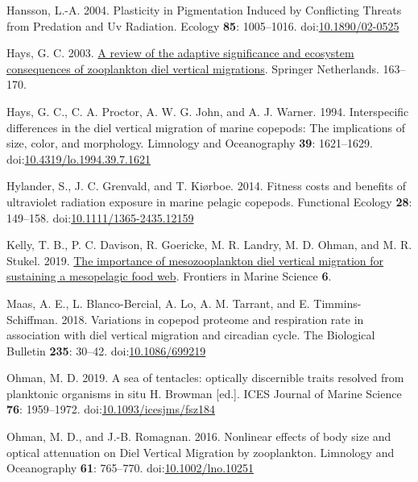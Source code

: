 \documentclass[
]{article}
\newlength{\cslhangindent}
\newlength{\cslentryspacingunit} %
\newenvironment{CSLReferences}[2] %
 {%
  \setlength{\parindent}{0pt}
  \ifodd #1
  \let\oldpar\par
  \def\par{\hangindent=\cslhangindent\oldpar}
  \fi
  \setlength{\parskip}{#2\cslentryspacingunit}
 }%
 {}
\begin{document}
\begin{CSLReferences}{1}{0}
\leavevmode{}%
Hansson, L.-A. 2004. Plasticity in Pigmentation Induced by Conflicting
Threats from Predation and Uv Radiation. Ecology \textbf{85}:
1005--1016. doi:\href{https://doi.org/10.1890/02-0525}{10.1890/02-0525}

\leavevmode{}%
Hays, G. C. 2003. \href{https://doi.org/10.1007/978-94-017-2276-6_18}{A
review of the adaptive significance and ecosystem consequences of
zooplankton diel vertical migrations}. Springer Netherlands. 163--170.

\leavevmode{}%
Hays, G. C., C. A. Proctor, A. W. G. John, and A. J. Warner. 1994.
Interspecific differences in the diel vertical migration of marine
copepods: The implications of size, color, and morphology. Limnology and
Oceanography \textbf{39}: 1621--1629.
doi:\href{https://doi.org/10.4319/lo.1994.39.7.1621}{10.4319/lo.1994.39.7.1621}

\leavevmode{}%
Hylander, S., J. C. Grenvald, and T. Kiørboe. 2014. Fitness costs and
benefits of ultraviolet radiation exposure in marine pelagic copepods.
Functional Ecology \textbf{28}: 149--158.
doi:\href{https://doi.org/10.1111/1365-2435.12159}{10.1111/1365-2435.12159}

\leavevmode{}%
Kelly, T. B., P. C. Davison, R. Goericke, M. R. Landry, M. D. Ohman, and
M. R. Stukel. 2019.
\href{https://www.frontiersin.org/articles/10.3389/fmars.2019.00508}{The
importance of mesozooplankton diel vertical migration for sustaining a
mesopelagic food web}. Frontiers in Marine Science \textbf{6}.

\leavevmode{}%
Maas, A. E., L. Blanco-Bercial, A. Lo, A. M. Tarrant, and E.
Timmins-Schiffman. 2018. Variations in copepod proteome and respiration
rate in association with diel vertical migration and circadian cycle.
The Biological Bulletin \textbf{235}: 30--42.
doi:\href{https://doi.org/10.1086/699219}{10.1086/699219}

\leavevmode{}%
Ohman, M. D. 2019. A sea of tentacles: optically discernible traits
resolved from planktonic organisms in situ H. Browman {[}ed.{]}. ICES
Journal of Marine Science \textbf{76}: 1959--1972.
doi:\href{https://doi.org/10.1093/icesjms/fsz184}{10.1093/icesjms/fsz184}

\leavevmode{}%
Ohman, M. D., and J.-B. Romagnan. 2016. Nonlinear effects of body size
and optical attenuation on Diel Vertical Migration by zooplankton.
Limnology and Oceanography \textbf{61}: 765--770.
doi:\href{https://doi.org/10.1002/lno.10251}{10.1002/lno.10251}


\end{CSLReferences}
\end{document}
